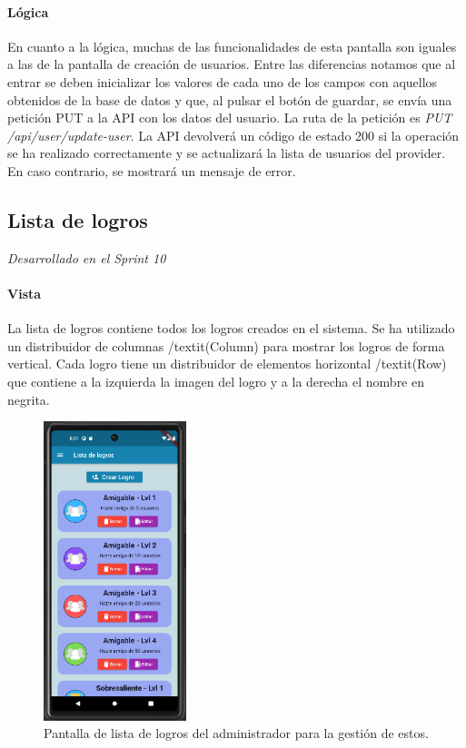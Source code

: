 \paragraph*{Lógica}
En cuanto a la lógica, muchas de las funcionalidades de esta pantalla son iguales a las de la pantalla de creación de usuarios.
Entre las diferencias notamos que al entrar se deben inicializar los valores de cada uno de los campos con aquellos obtenidos de la base de datos y que, al pulsar el botón de guardar, se envía una petición PUT a la API con los datos del usuario. La ruta de la petición es \textit{PUT /api/user/update-user}. La API devolverá un código de estado 200 si la operación se ha realizado correctamente y se actualizará la lista de usuarios del provider. En caso contrario, se mostrará un mensaje de error.


\subsection{Lista de logros} 

\textit{Desarrollado en el Sprint 10}

\paragraph*{Vista}
La lista de logros contiene todos los logros creados en el sistema. Se ha utilizado un distribuidor de columnas /textit{(Column)} para mostrar los logros de forma vertical. 
Cada logro tiene un distribuidor de elementos horizontal /textit{(Row)} que contiene a la izquierda la imagen del logro y a la derecha el nombre en negrita. 

\begin{figure}[H]
  \centering
  \includegraphics[width=0.37\textwidth]{imagenes/c7/listalogros.png}
  \caption{Pantalla de lista de logros del administrador para la gestión de estos.} 
  \label{fig:listalogros}
\end{figure}


